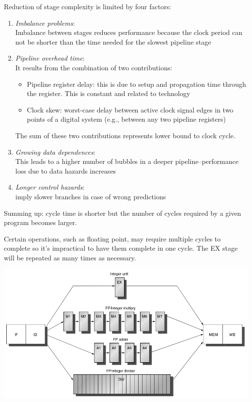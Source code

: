 Reduction of stage complexity is limited by four factors:
\begin{enumerate}
    \item \textit{Imbalance problems}:\\
    Imbalance between stages reduces performance because the clock period can not be shorter than the time needed for the slowest pipeline stage
    \item \textit{Pipeline overhead time}:\\
    It results from the combination of two contributions:
    \begin{itemize}
        \item Pipeline register delay: this is due to setup and propagation time through the register. This is constant and related to technology 
        \item Clock skew: worst-case delay between active clock signal edges in two points of a digital system (e.g., between any two pipeline registers)
    \end{itemize}
    The sum of these two contributions represents lower bound to clock cycle.
    \item \textit{Growing data dependences}:\\
    This leads to a higher number of bubbles in a deeper pipeline–performance loss due to data hazards increases
    \item \textit{Longer control hazards}:\\
    imply slower branches in case of wrong predictions
\end{enumerate}

Summing up: cycle time is shorter but the number of cycles required by a given program becomes larger.

Certain operations, such as floating point, may require multiple cycles to complete so it's impractical to have them complete in one cycle.
The EX stage will be repeated as many times as necessary.

\includegraphics[width=\textwidth]{images/superpipeline.png}

